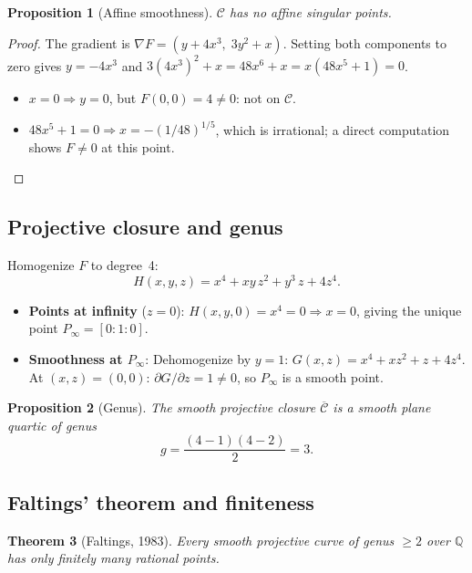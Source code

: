 \documentclass[12pt, a4paper]{article}
\newtheorem{theorem}{Theorem}[section]
\newtheorem{proposition}[theorem]{Proposition}
\theoremstyle{definition}
\newcommand{\Q}{\mathbb{Q}}
\begin{document}
\begin{proposition}[Affine smoothness]\label{prop:smooth}
  $\mathcal{C}$ has no affine singular points.
\end{proposition}
\begin{proof}
  The gradient is $\nabla F = (y + 4x^3,\; 3y^2 + x)$.
  Setting both components to zero gives $y = -4x^3$ and $3(4x^3)^2 + x = 48x^6+x = x(48x^5+1) = 0$.
  \begin{itemize}
    \item $x=0 \Rightarrow y=0$, but $F(0,0)=4\neq 0$: not on $\mathcal{C}$.
    \item $48x^5+1=0 \Rightarrow x = -(1/48)^{1/5}$, which is irrational; a direct computation shows $F\neq 0$ at this point. \qedhere
  \end{itemize}
\end{proof}

\subsection{Projective closure and genus}

Homogenize $F$ to degree~4:
\[
  H(x,y,z) = x^4 + xy\,z^2 + y^3\,z + 4z^4.
\]
\begin{itemize}
  \item \textbf{Points at infinity} ($z=0$): $H(x,y,0) = x^4 = 0 \Rightarrow x=0$, giving the unique
        point $P_\infty = [0:1:0]$.
  \item \textbf{Smoothness at $P_\infty$}: Dehomogenize by $y=1$: $G(x,z) = x^4+xz^2+z+4z^4$.
        At $(x,z)=(0,0)$: $\partial G/\partial z = 1\neq 0$, so $P_\infty$ is a smooth point.
\end{itemize}

\begin{proposition}[Genus]\label{prop:genus}
  The smooth projective closure $\overline{\mathcal{C}}$ is a smooth plane quartic of genus
  \[
    g = \frac{(4-1)(4-2)}{2} = 3.
  \]
\end{proposition}

\subsection{Faltings' theorem and finiteness}

\begin{theorem}[Faltings, 1983]
  Every smooth projective curve of genus $\geq 2$ over $\Q$ has only finitely many
  rational points.
\end{theorem}
\end{document}

